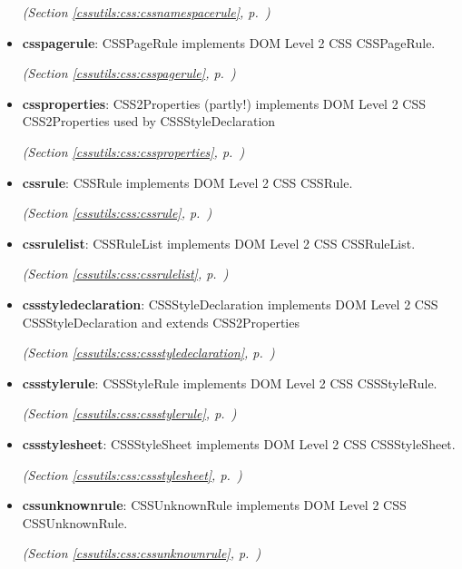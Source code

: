 \begin{itemize}
  \textit{(Section \ref{cssutils:css:cssnamespacerule}, p.~\pageref{cssutils:css:cssnamespacerule})}

\item \textbf{csspagerule}: 
CSSPageRule implements DOM Level 2 CSS CSSPageRule.


  \textit{(Section \ref{cssutils:css:csspagerule}, p.~\pageref{cssutils:css:csspagerule})}

\item \textbf{cssproperties}: 
CSS2Properties (partly!) implements DOM Level 2 CSS CSS2Properties used
by CSSStyleDeclaration


  \textit{(Section \ref{cssutils:css:cssproperties}, p.~\pageref{cssutils:css:cssproperties})}

\item \textbf{cssrule}: 
CSSRule implements DOM Level 2 CSS CSSRule.


  \textit{(Section \ref{cssutils:css:cssrule}, p.~\pageref{cssutils:css:cssrule})}

\item \textbf{cssrulelist}: 
CSSRuleList implements DOM Level 2 CSS CSSRuleList.


  \textit{(Section \ref{cssutils:css:cssrulelist}, p.~\pageref{cssutils:css:cssrulelist})}

\item \textbf{cssstyledeclaration}: 
CSSStyleDeclaration implements DOM Level 2 CSS CSSStyleDeclaration and
extends CSS2Properties


  \textit{(Section \ref{cssutils:css:cssstyledeclaration}, p.~\pageref{cssutils:css:cssstyledeclaration})}

\item \textbf{cssstylerule}: 
CSSStyleRule implements DOM Level 2 CSS CSSStyleRule.


  \textit{(Section \ref{cssutils:css:cssstylerule}, p.~\pageref{cssutils:css:cssstylerule})}

\item \textbf{cssstylesheet}: 
CSSStyleSheet implements DOM Level 2 CSS CSSStyleSheet.


  \textit{(Section \ref{cssutils:css:cssstylesheet}, p.~\pageref{cssutils:css:cssstylesheet})}

\item \textbf{cssunknownrule}: 
CSSUnknownRule implements DOM Level 2 CSS CSSUnknownRule.


  \textit{(Section \ref{cssutils:css:cssunknownrule}, p.~\pageref{cssutils:css:cssunknownrule})}


\end{itemize}
